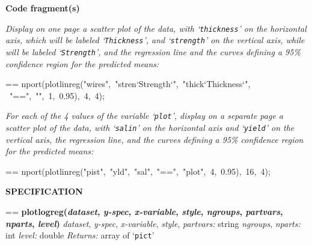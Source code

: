 \documentclass{book}
\makeatletter
\newcommand\Texinfocommandstyletextvar[1]{{\normalfont{}\textsl{#1}}}%
\newenvironment{Texinfopreformatted}{%
  \par\GNUTobeylines\obeyspaces\frenchspacing\parskip=\z@\parindent=\z@}{}
{\catcode`\^^M=13 \gdef\GNUTobeylines{\catcode`\^^M=13 \def^^M{\null\par}}}
\newenvironment{Texinfoindented}{\begin{list}{}{}\item\relax}{\end{list}}
\renewcommand{\_}{\Texinfounderscore\discretionary{}{}{}}
\makeatother
\begin{document}
\noindent{}\textbf{Code fragment(s)}

\emph{Display on one page a scatter plot of the data,
with `\texttt{thickness}' on the horizontal
axis, which will be labeled `\texttt{Thickness}',
and `\texttt{strength}' on the vertical axis,
while will be labeled `\texttt{Strength}', and the regression line
and the curves defining a 95\% confidence region for the predicted
means:}
\begin{Texinfoindented}
\begin{Texinfopreformatted}%
\ttfamily nport(plotlinreg("wires",\ "stren`Strength`",\ "thick`Thickness`",
\                 "==",\ "",\ 1,\ 0.95),\ 4,\ 4);
\end{Texinfopreformatted}
\end{Texinfoindented}

\emph{For each of the 4 values of the variable `\texttt{plot}',
display on a separate page a scatter plot of the data,
with `\texttt{salin}' on the horizontal
axis and `\texttt{yield}' on the vertical axis, the regression line,
and the curves defining a 95\% confidence region for the predicted
means:}
\begin{Texinfoindented}
\begin{Texinfopreformatted}%
\ttfamily nport(plotlinreg("pist",\ "yld",\ "sal",\ "==",\ "plot",\ 4,\ 0.95),\ 16,\ 4);
\end{Texinfopreformatted}
\end{Texinfoindented}

\noindent{}\textbf{SPECIFICATION}
\begin{Texinfoindented}
\begin{Texinfopreformatted}%
\textbf{plotlogreg(\Texinfocommandstyletextvar{dataset}, \Texinfocommandstyletextvar{y-spec}, \Texinfocommandstyletextvar{x-variable}, \Texinfocommandstyletextvar{style}, \Texinfocommandstyletextvar{ngroups}, \Texinfocommandstyletextvar{partvars}, \Texinfocommandstyletextvar{nparts}, \Texinfocommandstyletextvar{level})}
\Texinfocommandstyletextvar{dataset}, \Texinfocommandstyletextvar{y-spec}, \Texinfocommandstyletextvar{x-variable}, \Texinfocommandstyletextvar{style}, \Texinfocommandstyletextvar{partvars:} string
\Texinfocommandstyletextvar{ngroups}, \Texinfocommandstyletextvar{nparts:} int
\Texinfocommandstyletextvar{level:} double
\Texinfocommandstyletextvar{Returns:} array of `\texttt{pict}'
\end{Texinfopreformatted}
\end{Texinfoindented}
%
%
%
\end{document}
